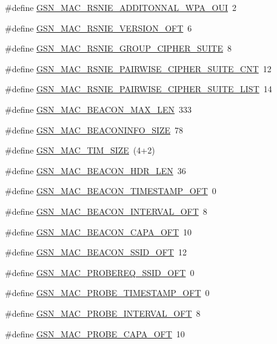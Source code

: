 \begin{DoxyCompactItemize}
\item 
\#define \hyperlink{a00523_a4ab9ae6e871ef284d2830449a6040fe4}{GSN\_\-MAC\_\-RSNIE\_\-ADDITONNAL\_\-WPA\_\-OUI}~2
\item 
\#define \hyperlink{a00523_a0245a2a197c963410da90558ea57291f}{GSN\_\-MAC\_\-RSNIE\_\-VERSION\_\-OFT}~6
\item 
\#define \hyperlink{a00523_ac016cddf62375d4f9f78e6dc72e64ce5}{GSN\_\-MAC\_\-RSNIE\_\-GROUP\_\-CIPHER\_\-SUITE}~8
\item 
\#define \hyperlink{a00523_a71b00668509235bb8a9bfb8d5db37350}{GSN\_\-MAC\_\-RSNIE\_\-PAIRWISE\_\-CIPHER\_\-SUITE\_\-CNT}~12
\item 
\#define \hyperlink{a00523_a3c9d04fd434b79ebc562b913d98cb726}{GSN\_\-MAC\_\-RSNIE\_\-PAIRWISE\_\-CIPHER\_\-SUITE\_\-LIST}~14
\item 
\#define \hyperlink{a00523_ad4cadb552f8ae1f86b629a6cd2f4067e}{GSN\_\-MAC\_\-BEACON\_\-MAX\_\-LEN}~333
\item 
\#define \hyperlink{a00523_ae92a862e245b3cc55c49100817a37a4e}{GSN\_\-MAC\_\-BEACONINFO\_\-SIZE}~78
\item 
\#define \hyperlink{a00523_af8ef931a53f85ec730dfc8611efe55f7}{GSN\_\-MAC\_\-TIM\_\-SIZE}~(4+2)
\item 
\#define \hyperlink{a00523_ad98484f6aa4389a8c2273ba17ce2242f}{GSN\_\-MAC\_\-BEACON\_\-HDR\_\-LEN}~36
\item 
\#define \hyperlink{a00523_a85dce590f6356a0a0440aa9ec83522ac}{GSN\_\-MAC\_\-BEACON\_\-TIMESTAMP\_\-OFT}~0
\item 
\#define \hyperlink{a00523_a98d352d869b285fd57a3b650df6ec7ed}{GSN\_\-MAC\_\-BEACON\_\-INTERVAL\_\-OFT}~8
\item 
\#define \hyperlink{a00523_a4888d24c3eab5cfe331e2808fb61efea}{GSN\_\-MAC\_\-BEACON\_\-CAPA\_\-OFT}~10
\item 
\#define \hyperlink{a00523_aabc5297018b37522a1a701f77d20c62c}{GSN\_\-MAC\_\-BEACON\_\-SSID\_\-OFT}~12
\item 
\#define \hyperlink{a00523_a403dea09ee15f865f0b12a3c3e6f5d30}{GSN\_\-MAC\_\-PROBEREQ\_\-SSID\_\-OFT}~0
\item 
\#define \hyperlink{a00523_a4a4a35493613496f5cf1f26795060d15}{GSN\_\-MAC\_\-PROBE\_\-TIMESTAMP\_\-OFT}~0
\item 
\#define \hyperlink{a00523_a15832d27bb013cb91d9075b20e1729b8}{GSN\_\-MAC\_\-PROBE\_\-INTERVAL\_\-OFT}~8
\item 
\#define \hyperlink{a00523_a54fca6ea76a9286a631437d6d49ae1ad}{GSN\_\-MAC\_\-PROBE\_\-CAPA\_\-OFT}~10

\end{DoxyCompactItemize}
